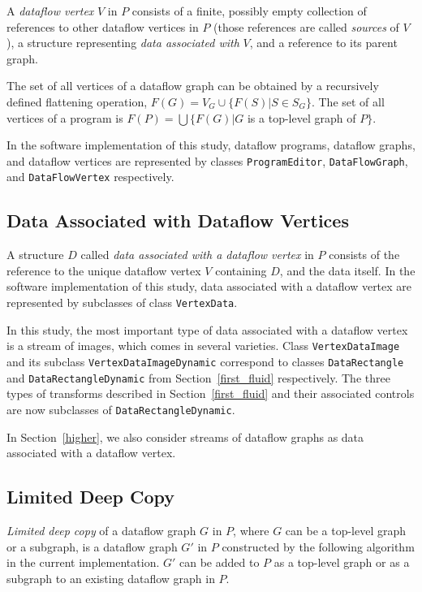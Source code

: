 \documentclass{llncs}
\begin{document}
A {\em dataflow vertex} $V$ in $P$ consists of a finite, possibly empty collection of references to other dataflow vertices in $P$ (those references
are called {\em sources} of $V$), a structure representing {\em data associated with} $V$, and a reference to its parent graph.

The set of all vertices of a dataflow graph can be obtained by a recursively defined flattening operation,
$F(G) = V_G \cup \{F(S)|S \in S_G\}$. The set of all vertices of a program is $F(P) = \bigcup \{F(G)|G$ is a top-level graph of $P\}$.

In the software implementation of this study, dataflow programs, dataflow graphs, and dataflow vertices are represented by
classes {\tt ProgramEditor}, {\tt DataFlowGraph}, and {\tt DataFlowVertex} respectively.

\subsection{Data Associated with Dataflow Vertices}

A structure $D$ called {\em data associated with a dataflow vertex} in $P$ consists of the reference to the unique dataflow vertex $V$ containing $D$,
and the data itself. In the software implementation of this study, data associated with a dataflow vertex are represented by subclasses of class {\tt VertexData}.

In this study, the most important type of data associated with a dataflow vertex is a stream of images, which comes in several varieties. Class {\tt VertexDataImage}
and its subclass {\tt VertexDataImageDynamic} correspond to classes {\tt  DataRectangle} and {\tt  DataRectangleDynamic} from Section~\ref{first_fluid} respectively.
The three types of transforms described in Section~\ref{first_fluid} and their associated controls are now subclasses of {\tt  DataRectangleDynamic}.

In Section~\ref{higher}, we also consider streams of dataflow graphs as data associated with a dataflow vertex.

\subsection{Limited Deep Copy}\label{limited_deep_copy}

{\em Limited deep copy} of a dataflow graph $G$ in $P$, where $G$ can be a top-level graph or a subgraph, is a dataflow graph $G'$ in $P$ constructed 
by the following algorithm in the current implementation. $G'$ can be added to $P$ as a top-level graph or as a subgraph to an existing dataflow graph in $P$.
\end{document}
